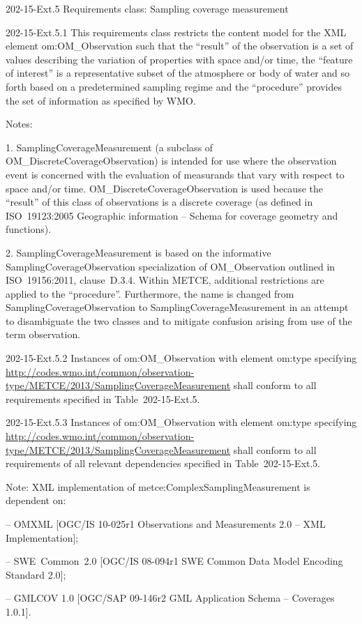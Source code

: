 202-15-Ext.5 Requirements class: Sampling coverage measurement

202-15-Ext.5.1 This requirements class restricts the content model for the XML element om:OM\_Observation such that the ``result'' of the observation is a set of values describing the variation of properties with space and/or time, the ``feature of interest'' is a representative subset of the atmosphere or body of water and so forth based on a predetermined sampling regime and the ``procedure'' provides the set of information as specified by WMO.

Notes:

1. SamplingCoverageMeasurement (a subclass of OM\_DiscreteCoverageObservation) is intended for use where the observation event is concerned with the evaluation of measurands that vary with respect to space and/or time. OM\_DiscreteCoverageObservation is used because the ``result'' of this class of observations is a discrete coverage (as defined in ISO~19123:2005 Geographic information -- Schema for coverage geometry and functions).

2. SamplingCoverageMeasurement is based on the informative SamplingCoverageObservation specialization of OM\_Observation outlined in ISO~19156:2011, clause~D.3.4. Within METCE, additional restrictions are applied to the ``procedure''. Furthermore, the name is changed from SamplingCoverageObservation to SamplingCoverageMeasurement in an attempt to disambiguate the two classes and to mitigate confusion arising from use of the term observation.

202-15-Ext.5.2 Instances of om:OM\_Observation with element om:type specifying \url{http://codes.wmo.int/common/observation-type/METCE/2013/SamplingCoverageMeasurement} shall conform to all requirements specified in Table~202-15-Ext.5.

202-15-Ext.5.3 Instances of om:OM\_Observation with element om:type specifying \url{http://codes.wmo.int/common/observation-type/METCE/2013/SamplingCoverageMeasurement} shall conform to all requirements of all relevant dependencies specified in Table~202-15-Ext.5.

Note: XML implementation of metce:ComplexSamplingMeasurement is dependent on:

-- OMXML {[}OGC/IS 10-025r1 Observations and Measurements 2.0 -- XML Implementation{]};

-- SWE~Common~2.0 {[}OGC/IS 08-094r1 SWE Common Data Model Encoding Standard 2.0{]};

-- GMLCOV 1.0 {[}OGC/SAP 09-146r2 GML Application Schema -- Coverages 1.0.1{]}.

